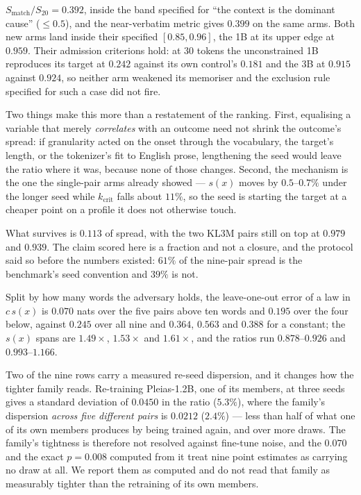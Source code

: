 $S_{\mathrm{match}}/S_{20} = 0.392$, inside the band specified for ``the context is the dominant
cause'' ($\le 0.5$), and the near-verbatim metric gives $0.399$ on the same arms. Both new arms
land inside their specified $[0.85, 0.96]$, the 1B at its upper edge at $0.959$. Their admission criterions
hold: at $30$ tokens the unconstrained 1B reproduces its target at $0.242$ against its own
control's $0.181$ and the 3B at $0.915$ against $0.924$, so neither arm weakened its memoriser and
the exclusion rule specified for such a case did not fire.

Two things make this more than a restatement of the ranking. First, equalising a variable that
merely \emph{correlates} with an outcome need not shrink the outcome's spread: if granularity acted
on the onset through the vocabulary, the target's length, or the tokenizer's fit to English prose,
lengthening the seed would leave the ratio where it was, because none of those changes. Second, the
mechanism is the one the single-pair arms already showed --- $s(x)$ moves by $0.5$--$0.7\%$ under
the longer seed while $k_{\mathrm{crit}}$ falls about $11\%$, so the seed is starting the target at
a cheaper point on a profile it does not otherwise touch.

What survives is $0.113$ of spread, with the two KL3M pairs still on top at $0.979$ and $0.939$.
The claim scored here is a fraction and not a closure, and the protocol said so before the
numbers existed: $61\%$ of the nine-pair spread is the benchmark's seed convention and $39\%$ is
not.

Split by how many words the adversary holds, the leave-one-out error of a law in $c\,s(x)$ is
$0.070$ nats over the five pairs above ten words and $0.195$ over the four below, against $0.245$
over all nine and $0.364$, $0.563$ and $0.388$ for a constant; the $s(x)$ spans are $1.49\times$,
$1.53\times$ and $1.61\times$, and the ratios run $0.878$--$0.926$ and $0.993$--$1.166$.

Two of the nine rows carry a measured re-seed dispersion, and it changes how the tighter family
reads. Re-training Pleias-1.2B, one of its members, at three seeds gives a standard deviation of
$0.0450$ in the ratio ($5.3\%$), where the family's dispersion \emph{across five different pairs} is
$0.0212$ ($2.4\%$) --- less than half of what one of its own members produces by being trained again,
and over more draws. The family's tightness is therefore not resolved against fine-tune noise, and
the $0.070$ and the exact $p = 0.008$ computed from it treat nine point estimates as carrying no draw
at all. We report them as computed and do not read that family as measurably tighter than the
retraining of its own members.

